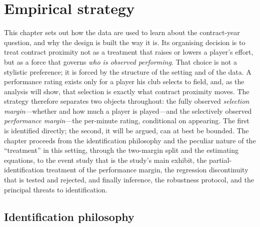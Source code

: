 
\section{Empirical strategy}
\label{sec:strategy}

This chapter sets out how the data are used to learn about the contract-year
question, and why the design is built the way it is. Its organising decision is to
treat contract proximity not as a treatment that raises or lowers a player's
effort, but as a force that governs \emph{who is observed performing}. That choice
is not a stylistic preference; it is forced by the structure of the setting and of
the data. A performance rating exists only for a player his club selects to field,
and, as the analysis will show, that selection is exactly what contract proximity
moves. The strategy therefore separates two objects throughout: the fully observed
\emph{selection margin}---whether and how much a player is played---and the
selectively observed \emph{performance margin}---the per-minute rating, conditional
on appearing. The first is identified directly; the second, it will be argued, can
at best be bounded. The chapter proceeds from the identification philosophy and the
peculiar nature of the ``treatment'' in this setting, through the two-margin split
and the estimating equations, to the event study that is the study's main exhibit,
the partial-identification treatment of the performance margin, the regression
discontinuity that is tested and rejected, and finally inference, the robustness
protocol, and the principal threats to identification.

\subsection{Identification philosophy}
\label{sec:strategy-philosophy}


